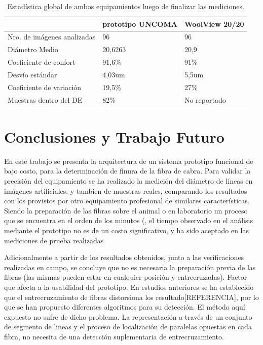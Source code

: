 \documentclass[runningheads,a4paper]{llncs}
\begin{document}
\begin{table}[htbp]
\begin{center}
\begin{tabular}{|l|l|l|}
\hline
& prototipo UNCOMA & WoolView 20/20 \\
\hline \hline \hline
Nro. de imágenes analizadas & 96 & 96 \\ \hline
Diámetro Medio & 20,6263 & 20,9 \\ \hline
Coeficiente de confort & 91,6\% & 91\% \\ \hline
Desvío estándar & 4,03um & 5,5um \\ \hline
Coeficiente de variación & 19,5\% & 27\% \\ \hline
Muestras dentro del DE & 82\% & No reportado \\ \hline
\end{tabular}
\caption{Estadística global de ambos equipamientos luego de finalizar las mediciones.}
\label{tabla:sencilla}
\end{center}
\end{table}


\section{Conclusiones y Trabajo Futuro}
En este trabajo se presenta la arquitectura de un sistema prototipo funcional
de bajo costo, para la determinación de finura de la fibra de cabra.
Para validar la precisión del equipamiento se ha realizado la medición
del diámetro de líneas en imágenes artificiales, y tambien de 
muestras reales, comparando los resultados con los provistos por
otro equipamiento profesional de similares características.
Siendo la preparación de las fibras sobre el animal o en laboratorio un proceso que se encuentra en el orden de los minutos (, el tiempo observado en el análisis mediante el prototipo no es de un costo significativo, y ha sido aceptado  en las mediciones de prueba realizadas 

Adicionalmente a partir de los resultados obtenidos, junto a las verificaciones realizadas en campo, se concluye que no es necesaria la preparación previa de las fibras (las mismas pueden estar en cualquier posición y entrecruzadas). Factor que afecta a la usabilidad del prototipo. 
En estudios anteriores se ha establecido que el entrecruzamiento de fibras distorsiona los resultado[REFERENCIA], por lo que se han propuesto diferentes algoritmos para su detección.
El método aquí expuesto no sufre de dicho problema. 
La representación a través de un conjunto de segmento de lineas y el proceso de localización de paralelas opuestas en cada fibra, no necesita de una detección suplementaria de entrecruzamiento. 
\end{document}
